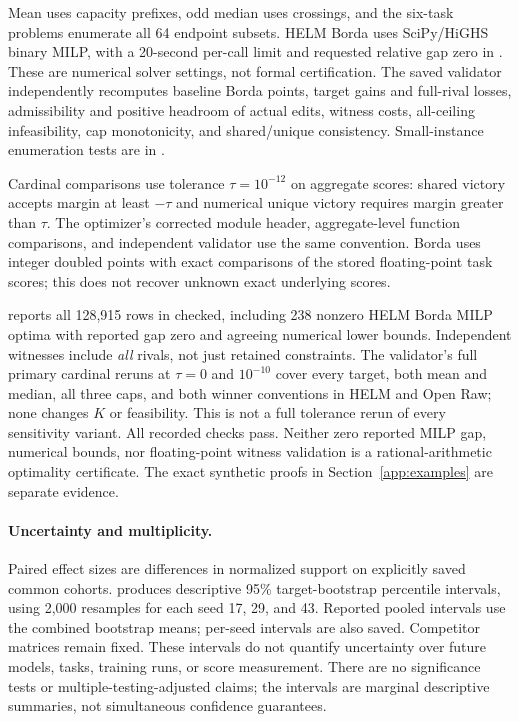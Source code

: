 Mean uses capacity prefixes, odd median uses crossings, and the six-task problems enumerate all 64 endpoint subsets. HELM Borda uses SciPy/HiGHS binary MILP, with a 20-second per-call limit and requested relative gap zero in . These are numerical solver settings, not formal certification. The saved validator independently recomputes baseline Borda points, target gains and full-rival losses, admissibility and positive headroom of actual edits, witness costs, all-ceiling infeasibility, cap monotonicity, and shared/unique consistency. Small-instance enumeration tests are in .

Cardinal comparisons use tolerance $\tau=10^{-12}$ on aggregate scores: shared victory accepts margin at least $-\tau$ and numerical unique victory requires margin greater than $\tau$. The optimizer's corrected module header, aggregate-level function comparisons, and independent validator use the same convention. Borda uses integer doubled points with exact comparisons of the stored floating-point task scores; this does not recover unknown exact underlying scores.

 reports all 128,915 rows in  checked, including 238 nonzero HELM Borda MILP optima with reported gap zero and agreeing numerical lower bounds. Independent witnesses include \emph{all} rivals, not just retained constraints. The validator's full primary cardinal reruns at $\tau=0$ and $10^{-10}$ cover every target, both mean and median, all three caps, and both winner conventions in HELM and Open Raw; none changes $K$ or feasibility. This is not a full tolerance rerun of every sensitivity variant. All recorded checks pass. Neither zero reported MILP gap, numerical bounds, nor floating-point witness validation is a rational-arithmetic optimality certificate. The exact synthetic proofs in Section~\ref{app:examples} are separate evidence.

\paragraph{Uncertainty and multiplicity.}
Paired effect sizes are differences in normalized support on explicitly saved common cohorts.  produces descriptive 95\% target-bootstrap percentile intervals, using 2,000 resamples for each seed 17, 29, and 43. Reported pooled intervals use the combined bootstrap means; per-seed intervals are also saved. Competitor matrices remain fixed. These intervals do not quantify uncertainty over future models, tasks, training runs, or score measurement. There are no significance tests or multiple-testing-adjusted claims; the intervals are marginal descriptive summaries, not simultaneous confidence guarantees.

